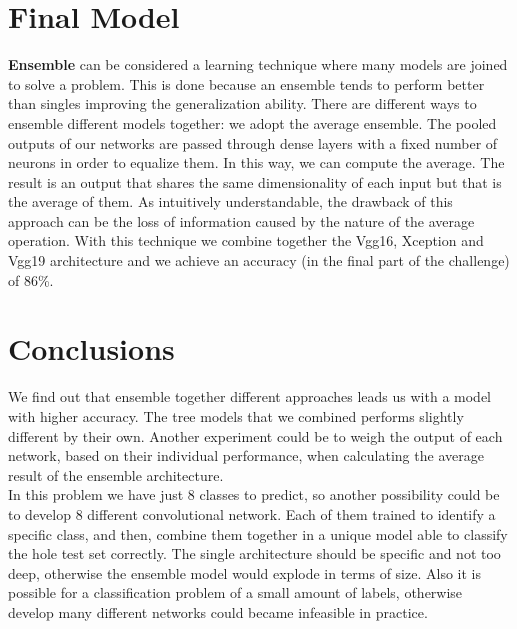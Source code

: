\documentclass[11pt, oneside]{article}
\begin{document}
\section{Final Model}
\textbf{Ensemble} can be considered a learning technique where many models are joined to solve a problem. This is done because an ensemble tends to perform better than singles improving the generalization ability. There are different ways to ensemble different models together: we adopt the average ensemble. The pooled outputs of our networks are passed through dense layers with a fixed number of neurons in order to equalize them. In this way, we can compute the average. The result is an output that shares the same dimensionality of each input but that is the average of them. As intuitively understandable, the drawback of this approach can be the loss of information caused by the nature of the average operation. With this technique we combine together the Vgg16, Xception and Vgg19 architecture and we achieve an accuracy (in the final part of the challenge) of 86\%.
\section{Conclusions}
We find out that ensemble together different approaches leads us with a model with higher accuracy. The tree models that we combined performs slightly different by their own. Another experiment could be to weigh the output of each network, based on their individual performance, when calculating the average result of the ensemble architecture.\\
In this problem we have just 8 classes to predict, so another possibility could be to develop 8 different convolutional network. Each of them trained to identify a specific class, and then, combine them together in a unique model able to classify the hole test set correctly. The single architecture should be specific and not too deep, otherwise the ensemble model would explode in terms of size. Also it is possible for a classification problem of a small amount of labels, otherwise develop many different networks could became infeasible in practice.
\end{document}
